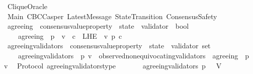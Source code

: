 %
\begin{isabellebody}%
%
%
\isadelimtheory
%
\endisadelimtheory
%
\isatagtheory
{}\isamarkupfalse%
\ CliqueOracle\isanewline
\isanewline
{}\ Main\ CBCCasper\ LatestMessage\ StateTransition\ ConsensusSafety\isanewline
\isanewline
{}%
\endisatagtheory
{\isafoldtheory}%
%
\isadelimtheory
\isanewline
%
\endisadelimtheory
\isanewline
\isanewline
\isanewline
\isanewline
\isanewline
\isanewline
\isanewline
\isanewline
\isanewline
\isanewline
\isanewline
\isanewline
\isanewline
\isanewline
\isanewline
\isanewline
\isanewline
\isanewline
{}\isamarkupfalse%
\ agreeing\ {\isacharcolon}{\isacharcolon}\ {\isachardoublequoteopen}{\isacharparenleft}consensus{\isacharunderscore}value{\isacharunderscore}property\ {\isacharasterisk}\ state\ {\isacharasterisk}\ validator{\isacharparenright}\ {\isasymRightarrow}\ bool{\isachardoublequoteclose}\isanewline
\ \ \isanewline
\ \ \ \ {\isachardoublequoteopen}agreeing\ {\isacharequal}\ {\isacharparenleft}{\isasymlambda}{\isacharparenleft}p{\isacharcomma}\ {\isasymsigma}{\isacharcomma}\ v{\isacharparenright}{\isachardot}\ {\isasymforall}\ c\ {\isasymin}\ L{\isacharunderscore}H{\isacharunderscore}E\ {\isasymsigma}\ v{\isachardot}\ p\ c{\isacharparenright}{\isachardoublequoteclose}\isanewline
\isanewline
\isanewline
{}\isamarkupfalse%
\ agreeing{\isacharunderscore}validators\ {\isacharcolon}{\isacharcolon}\ {\isachardoublequoteopen}{\isacharparenleft}consensus{\isacharunderscore}value{\isacharunderscore}property\ {\isacharasterisk}\ state{\isacharparenright}\ {\isasymRightarrow}\ validator\ set{\isachardoublequoteclose}\isanewline
\ \ \isanewline
\ \ \ \ {\isachardoublequoteopen}agreeing{\isacharunderscore}validators\ {\isacharequal}\ {\isacharparenleft}{\isasymlambda}{\isacharparenleft}p{\isacharcomma}\ {\isasymsigma}{\isacharparenright}{\isachardot}{\isacharbraceleft}v\ {\isasymin}\ observed{\isacharunderscore}non{\isacharunderscore}equivocating{\isacharunderscore}validators\ {\isasymsigma}{\isachardot}\ agreeing\ \ {\isacharparenleft}p{\isacharcomma}\ {\isasymsigma}{\isacharcomma}\ v{\isacharparenright}{\isacharbraceright}{\isacharparenright}{\isachardoublequoteclose}\isanewline
\isanewline
{}\isamarkupfalse%
\ {\isacharparenleft}\ Protocol{\isacharparenright}\ agreeing{\isacharunderscore}validators{\isacharunderscore}type\ {\isacharcolon}\isanewline
\ \ {\isachardoublequoteopen}{\isasymforall}\ {\isasymsigma}\ {\isasymin}\ {\isasymSigma}{\isachardot}\ agreeing{\isacharunderscore}validators\ {\isacharparenleft}p{\isacharcomma}\ {\isasymsigma}{\isacharparenright}\ {\isasymsubseteq}\ V{\isachardoublequoteclose}\isanewline

\end{isabellebody}
